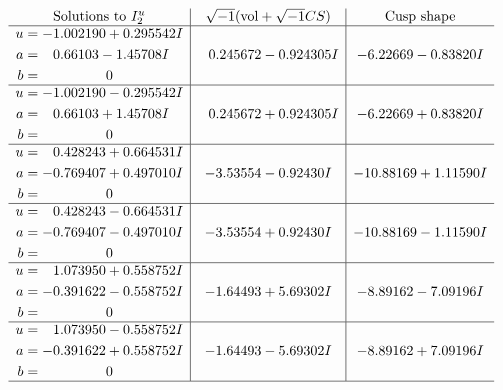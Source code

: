 \documentclass[1p]{elsarticle_modified}
\theoremstyle{definition}
\newcommand{\I}{\sqrt{-1}}
\begin{document}
$$\begin{array}{c|c|c}  
\text{Solutions to }I^u_{2}& \I (\text{vol} + \sqrt{-1}CS) & \text{Cusp shape}\\
 \hline 
\begin{aligned}
u &= -1.002190 + 0.295542 I \\
a &= \phantom{-}0.66103 - 1.45708 I \\
b &= \phantom{-0.000000 } 0\end{aligned}
 & \phantom{-}0.245672 - 0.924305 I & -6.22669 - 0.83820 I \\ \hline\begin{aligned}
u &= -1.002190 - 0.295542 I \\
a &= \phantom{-}0.66103 + 1.45708 I \\
b &= \phantom{-0.000000 } 0\end{aligned}
 & \phantom{-}0.245672 + 0.924305 I & -6.22669 + 0.83820 I \\ \hline\begin{aligned}
u &= \phantom{-}0.428243 + 0.664531 I \\
a &= -0.769407 + 0.497010 I \\
b &= \phantom{-0.000000 } 0\end{aligned}
 & -3.53554 - 0.92430 I & -10.88169 + 1.11590 I \\ \hline\begin{aligned}
u &= \phantom{-}0.428243 - 0.664531 I \\
a &= -0.769407 - 0.497010 I \\
b &= \phantom{-0.000000 } 0\end{aligned}
 & -3.53554 + 0.92430 I & -10.88169 - 1.11590 I \\ \hline\begin{aligned}
u &= \phantom{-}1.073950 + 0.558752 I \\
a &= -0.391622 - 0.558752 I \\
b &= \phantom{-0.000000 } 0\end{aligned}
 & -1.64493 + 5.69302 I & -8.89162 - 7.09196 I \\ \hline\begin{aligned}
u &= \phantom{-}1.073950 - 0.558752 I \\
a &= -0.391622 + 0.558752 I \\
b &= \phantom{-0.000000 } 0\end{aligned}
 & -1.64493 - 5.69302 I & -8.89162 + 7.09196 I\\
 \hline 
 \end{array}$$\newpage\newpage\renewcommand{\arraystretch}{1}
\end{document}
